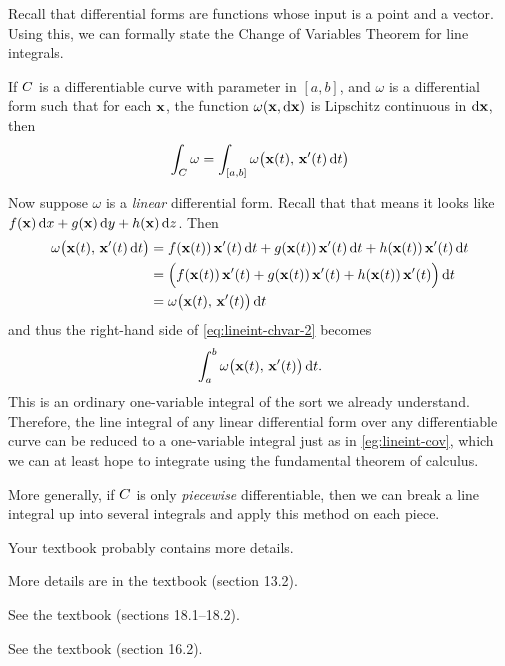 \documentclass[12pt]{amsart}
\begin{document}
Recall that differential forms are functions whose input is a point and a vector.
Using this, we can formally state the Change of Variables Theorem for line integrals.

\begin{thm}
  If $\curve$ is a differentiable curve with parameter in $[a,b]$, and $\omega$ is a differential form such that for each $\ptx$, the function $\omega(\ptx,\dpx)$ is Lipschitz continuous in $\dpx$, then
  \begin{equation}
    \lint{\curve} \omega = \lint{[a,b]} \omega\big(\curvept(t),\, \curvept'(t) \,\dt\big)\label{eq:lineint-chvar-2}
  \end{equation}
\end{thm}

Now suppose $\omega$ is a \emph{linear} differential form.
Recall that that means it looks like $f(\ptx)\,\dx + g(\ptx)\,\dy + h(\ptx)\,\dz$.
Then
\begin{align*}
  \omega\big(\curvept(t),\, \curvept'(t) \,\dt\big) &=
  f(\curvept(t))\,\curvept'(t) \,\dt + g(\curvept(t))\,\curvept'(t) \,\dt + h(\curvept(t))\,\curvept'(t) \,\dt\\
  &= \Big(f(\curvept(t))\,\curvept'(t) + g(\curvept(t))\,\curvept'(t) + h(\curvept(t))\,\curvept'(t)\Big) \,\dt\\
  &= \omega\big(\curvept(t),\, \curvept'(t)\big)\,\dt
\end{align*}
and thus the right-hand side of \cref{eq:lineint-chvar-2} becomes
\[ \itint t a b {\omega\big(\curvept(t),\, \curvept'(t)\big)}. \]
This is an ordinary one-variable integral of the sort we already understand.
Therefore, the line integral of any linear differential form over any differentiable curve can be reduced to a one-variable integral just as in \cref{eg:lineint-cov}, which we can at least hope to integrate using the fundamental theorem of calculus.

More generally, if $\curve$ is only \emph{piecewise} differentiable, then we can break a line integral up into several integrals and apply this method on each piece.
\begin{notextbook}Your textbook probably contains more details.\end{notextbook}%
\begin{stewart}More details are in the textbook (section 13.2).\end{stewart}%
\begin{hugheshallett}See the textbook (sections 18.1--18.2).\end{hugheshallett}%
\begin{rogawski}See the textbook (section 16.2).\end{rogawski}%
\end{document}
